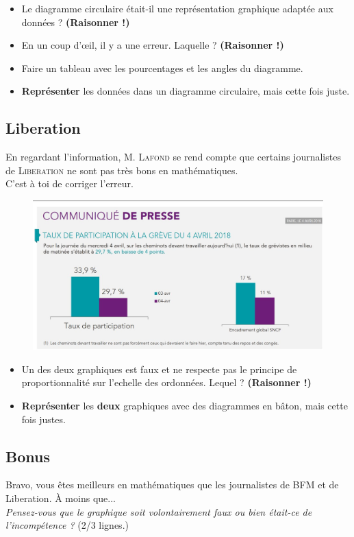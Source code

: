 \documentclass[12pt]{article}
\begin{document}
\begin{itemize}
	\item[1.] Le diagramme circulaire était-il une représentation graphique adaptée aux données ? \textbf{(Raisonner !)}
	\item[2.] En un coup d'œil, il y a une erreur. Laquelle ? \textbf{(Raisonner !)}
	\item[3.] Faire un tableau avec les pourcentages et les angles du diagramme.
	\item[4.] \textbf{Représenter} les données dans un diagramme circulaire, mais cette fois juste.
\end{itemize}	

\subsection*{Liberation}

\begin{multicols}{2}

En regardant l'information, \textsc{M. Lafond} se rend compte que certains journalistes de \textsc{Liberation} ne sont pas très bons en mathématiques.\\
C'est à toi de corriger l'erreur. 

\begin{figure}[H]
	\centering
	\includegraphics[width=\linewidth]{3x1-statistiques/sources/liberation.jpg}
\end{figure}

\end{multicols}

\begin{itemize}
	\item[1.] Un des deux graphiques est faux et ne respecte pas le principe de proportionnalité sur l'echelle des ordonnées. Lequel ? \textbf{(Raisonner !)}
	\item[2.] \textbf{Représenter} les \textbf{deux} graphiques avec des diagrammes en bâton, mais cette fois justes.
\end{itemize}	

\subsection*{Bonus}

Bravo, vous êtes meilleurs en mathématiques que les journalistes de BFM et de Liberation. À moins que... \\
\textit{Pensez-vous que le graphique soit volontairement faux ou bien était-ce de l'incompétence ?} (2/3 lignes.)
\end{document}
